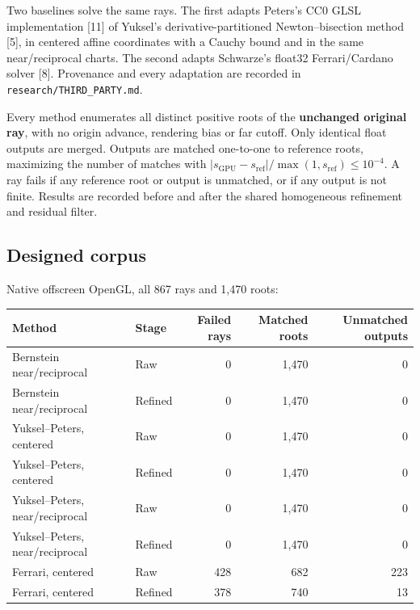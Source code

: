 \documentclass[11pt,a4paper]{article}
\begin{document}
Two baselines solve the same rays. The first adapts Peters's CC0 GLSL
implementation {[}11{]} of Yuksel's derivative-partitioned
Newton--bisection method {[}5{]}, in centered affine coordinates with a
Cauchy bound and in the same near/reciprocal charts. The second adapts
Schwarze's float32 Ferrari/Cardano solver {[}8{]}. Provenance and every
adaptation are recorded in \texttt{research/THIRD\_PARTY.md}.

Every method enumerates all distinct positive roots of the
\textbf{unchanged original ray}, with no origin advance, rendering bias
or far cutoff. Only identical float outputs are merged. Outputs are
matched one-to-one to reference roots, maximizing the number of matches
with
\(|s_{\mathrm{GPU}}-s_{\mathrm{ref}}|/\max(1,s_{\mathrm{ref}})\leq10^{-4}\).
A ray fails if any reference root or output is unmatched, or if any
output is not finite. Results are recorded before and after the shared
homogeneous refinement and residual filter.

\subsection{Designed corpus}\label{designed-corpus}

Native offscreen OpenGL, all 867 rays and 1,470 roots:

{
\begin{longtable}[]{@{}llrrr@{}}
\toprule\noalign{}
Method & Stage & Failed rays & Matched roots & Unmatched outputs \\
\midrule\noalign{}
\endhead
\bottomrule\noalign{}
\endlastfoot
Bernstein near/reciprocal & Raw & 0 & 1,470 & 0 \\
Bernstein near/reciprocal & Refined & 0 & 1,470 & 0 \\
Yuksel--Peters, centered & Raw & 0 & 1,470 & 0 \\
Yuksel--Peters, centered & Refined & 0 & 1,470 & 0 \\
Yuksel--Peters, near/reciprocal & Raw & 0 & 1,470 & 0 \\
Yuksel--Peters, near/reciprocal & Refined & 0 & 1,470 & 0 \\
Ferrari, centered & Raw & 428 & 682 & 223 \\
Ferrari, centered & Refined & 378 & 740 & 13 \\
\end{longtable}
}
\end{document}
